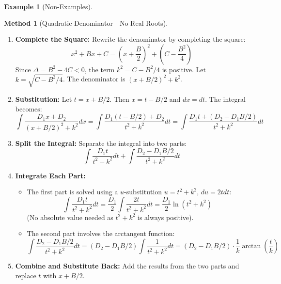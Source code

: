 \documentclass[11pt]{article}
\theoremstyle{plain}
\theoremstyle{definition}
\newtheorem{example}[theorem]{Example}
\newtheorem{method}[theorem]{Method}
\theoremstyle{remark}
\begin{document}
\begin{example}[Non-Examples]
\begin{method}[Quadratic Denominator - No Real Roots]
\leavevmode
\begin{enumerate}
    \item \textbf{Complete the Square:} Rewrite the denominator by completing the square:
    \[ x^2+Bx+C = \left(x + \frac{B}{2}\right)^2 + \left(C - \frac{B^2}{4}\right) \]
    Since $\Delta = B^2-4C < 0$, the term $k^2 = C - B^2/4$ is positive. Let $k = \sqrt{C-B^2/4}$. The denominator is $(x+B/2)^2 + k^2$.
    \item \textbf{Substitution:} Let $t = x+B/2$. Then $x=t-B/2$ and $dx=dt$. The integral becomes:
    \[ \int \frac{D_1 x + D_2}{(x+B/2)^2 + k^2} dx = \int \frac{D_1(t-B/2) + D_2}{t^2 + k^2} dt = \int \frac{D_1 t + (D_2 - D_1 B/2)}{t^2 + k^2} dt \]
    \item \textbf{Split the Integral:} Separate the integral into two parts:
    \[ \int \frac{D_1 t}{t^2 + k^2} dt + \int \frac{D_2 - D_1 B/2}{t^2 + k^2} dt \]
    \item \textbf{Integrate Each Part:}
    \begin{itemize}
        \item The first part is solved using a $u$-substitution $u=t^2+k^2$, $du=2t dt$:
        \[ \int \frac{D_1 t}{t^2 + k^2} dt = \frac{D_1}{2} \int \frac{2t}{t^2 + k^2} dt = \frac{D_1}{2} \ln(t^2 + k^2) \]
        (No absolute value needed as $t^2+k^2$ is always positive).
        \item The second part involves the arctangent function:
        \[ \int \frac{D_2 - D_1 B/2}{t^2 + k^2} dt = (D_2 - D_1 B/2) \int \frac{1}{t^2 + k^2} dt = (D_2 - D_1 B/2) \cdot \frac{1}{k} \arctan\left(\frac{t}{k}\right) \]
    \end{itemize}
    \item \textbf{Combine and Substitute Back:} Add the results from the two parts and replace $t$ with $x+B/2$.
\end{enumerate}
\end{method}


\end{example}
\end{document}
